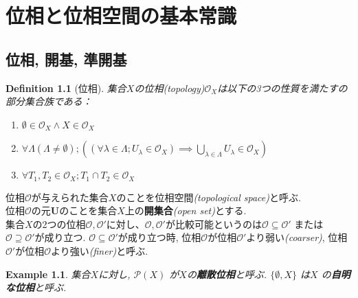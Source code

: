 \documentclass[lualatex]{ltjsbook}
\newtheorem{definition}[theorem]{Definition}
\theoremstyle{remark}
\theoremstyle{plain}
\newtheorem{example}[theorem]{Example}
\begin{document}
\chapter{位相と位相空間の基本常識}

\section{位相, 開基,  準開基}



\begin{definition}[位相]
	集合$X$の位相\textit{(topology)}$\mathcal{O}_X$は以下の3つの性質を満たすの部分集合族である：

	\begin{enumerate}
		\item $\emptyset \in \mathcal{O}_X \land X \in \mathcal{O}_X$
		\item $\forall \Lambda\left( \Lambda \neq \emptyset \right) ;\left( \left( \forall \lambda \in \Lambda; U_{\lambda} \in \mathcal{O}_X \right) \implies \bigcup_{\lambda \in \Lambda} U_{\lambda} \in \mathcal{O}_X \right) $ 
		\item $\forall T_1,  T_2 \in \mathcal{O}_X; T_1\cap T_2 \in \mathcal{O}_X$
	\end{enumerate}

\end{definition}


位相$\mathcal{O}$が与えられた集合$X$のことを位相空間\textit{(topological space)}と呼ぶ.\\
位相$\mathcal{O}$の元$\mathbf{U}$のことを集合$X$上の\textbf{開集合}\textit{(open set)}とする.\\
集合$X$の2つの位相$\mathcal{O}, \mathcal{O}'$に対し、$\mathcal{O}, \mathcal{O}'$が比較可能というのは$\mathcal{O} \subseteq \mathcal{O}' $ または$ \mathcal{O} \supseteq \mathcal{O}'$が成り立つ.
$\mathcal{O} \subseteq \mathcal{O}'$が成り立つ時,  位相$\mathcal{O}$が位相$\mathcal{O}'$より弱い\textit{(coarser)}, 位相$\mathcal{O}'$が位相$\mathcal{O}$より強い\textit{(finer)}と呼ぶ.


\begin{example}
	集合$X$に対し,  $\mathcal{P}\left( X \right) $ が$X$の\textbf{離散位相}と呼ぶ. $\{\emptyset ,  X\} $ は$X$ の\textbf{自明な位相}と呼ぶ.
\end{example}
\end{document}
